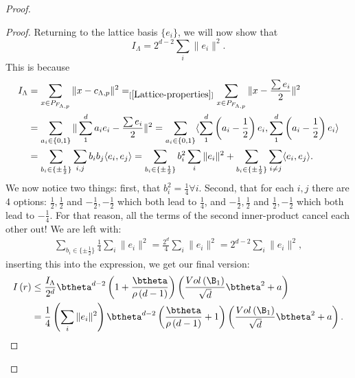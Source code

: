 \begin{proof}
\begin{proof}
    Returning to the lattice basis $\{e_i\}$, we will now show that
    \[
        I_\Lambda=2^{d-2}\sum_i\|e_i\|^2.
    \]
    This is because
    \begin{align*}
        I_\Lambda &= \sum_{x\in P_{F_{\Lambda,p}}}\|x - c_{\Lambda,p}\|^2=_{[\ref{Lattice-properties}]} \sum_{x\in P_{F_{\Lambda,p}}}\|x - \frac{\sum e_i}{2}\|^2\\
        &=\sum_{a_i\in\{0,1\}}\|\sum_1^d a_i e_i -\frac{\sum e_i}{2}\|^2=\sum_{a_i\in\{0,1\}}\langle\sum_1^d\left(a_i-\frac{1}{2}\right)e_i,\sum_1^d\left(a_i-\frac{1}{2}\right)e_i\rangle\\
        &=\sum_{b_i\in \{\pm\frac{1}{2}\}} \sum_{i,j} b_ib_j\langle e_i,e_j\rangle= \sum_{b_i\in \{\pm\frac{1}{2}\}}b_i^2\sum_i\|e_i\|^2 + \sum_{b_i\in \{\pm\frac{1}{2}\}}\sum_{i\neq j}\langle e_i,e_j\rangle.
    \end{align*}
    We now notice two things: first, that $b_i^2=\frac{1}{4} \forall i$. Second, that for each $i,j$ there are 4 options: $\frac{1}{2},\frac{1}{2}$ and $-\frac{1}{2},-\frac{1}{2}$ which both lead to $\frac{1}{4}$, and $-\frac{1}{2},\frac{1}{2}$ and $\frac{1}{2},-\frac{1}{2}$ which both lead to $-\frac{1}{4}$. For that reason, all the terms of the second inner-product cancel each other out! We are left with:
    \begin{align*}
        \sum_{b_i\in \{\pm\frac{1}{2}\}}\frac{1}{4}\sum_i\|e_i\|^2=\frac{2^d}{4}\sum_i\|e_i\|^2=2^{d-2}\sum_i\|e_i\|^2,
    \end{align*}
    inserting this into the expression, we get our final version:
    \begin{align*}
        I\left(r\right)&\leq \frac{I_\Lambda}{2^d}\btheta^{d-2}\left(1+\frac{\btheta}{\rho \left(d-1\right)}\right)\left(\frac{Vol\left(\B_1\right)}{\sqrt{d}}\btheta^2 + a\right)\\
        &= \frac{1}{4}\left(\sum_i\|e_i\|^2\right) \btheta^{d-2}\left(\frac{\btheta}{\rho \left(d-1\right)}+1\right)\left(\frac{Vol\left(\B_1\right)}{\sqrt{d}}\btheta^2+ a\right).
    \end{align*}
\end{proof}
\end{proof}

